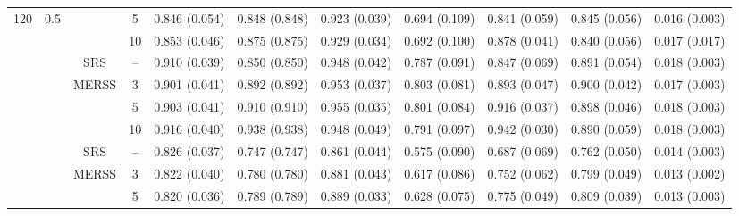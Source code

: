 \documentclass[twoside]{article}
\begin{document}
\begin{table}[!htb]
{\begin{tabular}{c c c c c c c c c c c}
 120 &          0.5            &                                          &  5    &
    0.846 (0.054) & 0.848 (0.848) & 0.923 (0.039) & 0.694 (0.109) & 0.841 (0.059) & 0.845 (0.056)& 0.016 (0.003)  \\

    &                      &                                          &  10   &
    0.853 (0.046) & 0.875 (0.875) & 0.929 (0.034) & 0.692 (0.100) & 0.878 (0.041) & 0.840 (0.056)& 0.017 (0.017)  \\


  

    \cmidrule(lr){2-11}
 &\multirow{9}{*}{ }  & 
    \multirow{1}{*}{SRS} & -- 
 &0.910 (0.039) & 0.850 (0.850) & 0.948 (0.042) & 0.787 (0.091) & 0.847 (0.069) & 0.891 (0.054)& 0.018 (0.003)  \\
    
    \cmidrule(lr){3-11}
    &                      & \multirow{3}{*}{MERSS}   &  3   & 
   0.901 (0.041) & 0.892 (0.892) & 0.953 (0.037) & 0.803 (0.081) & 0.893 (0.047) & 0.900 (0.042)& 0.017 (0.003)  \\

    &               0.7       &                                          &  5    &
   0.903 (0.041) & 0.910 (0.910) & 0.955 (0.035) & 0.801 (0.084) & 0.916 (0.037) & 0.898 (0.046)& 0.018 (0.003)  \\

    &                      &                                          &  10   &
  0.916 (0.040) & 0.938 (0.938) & 0.948 (0.049) & 0.791 (0.097) & 0.942 (0.030) & 0.890 (0.059)& 0.018 (0.003)  \\


    \bottomrule 
    
    \multirow{27}{*}{} & 
    \multirow{9}{*}{ }  & 
    \multirow{1}{*}{SRS} & -- 
 &0.826 (0.037) & 0.747 (0.747) & 0.861 (0.044) & 0.575 (0.090) & 0.687 (0.069) & 0.762 (0.050)& 0.014 (0.003)  \\
   
    \cmidrule(lr){3-11}
    &                      & \multirow{3}{*}{MERSS}   &  3   & 
   0.822 (0.040) & 0.780 (0.780) & 0.881 (0.043) & 0.617 (0.086) & 0.752 (0.062) & 0.799 (0.049)& 0.013 (0.002)  \\

    &         0.3             &                                          &  5    &
   0.820 (0.036) & 0.789 (0.789) & 0.889 (0.033) & 0.628 (0.075) & 0.775 (0.049) & 0.809 (0.039)& 0.013 (0.003)  \\


\end{tabular}}
\end{table}
\end{document}
